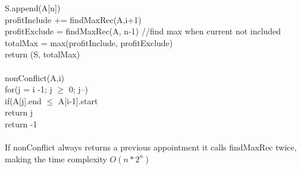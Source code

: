 \documentclass[12pt]{article}
\begin{document}
\begin{enumerate}
\begin{enumerate}
 \hspace*{15mm} S.append(A[n])\\
 \hspace*{15mm} profitInclude += findMaxRec(A,i+1)\\
 \hspace*{10mm} profitExclude = findMaxRec(A, n-1) //find max when current not included \\
 \hspace*{10mm} totalMax = max(profitInclude, profitExclude) \\
 return (S, totalMax)\\
 \\
 nonConflict(A,i)\\
 \hspace*{10mm}for(j = i -1; j $\geq$ 0; j--)\\
 \hspace*{15mm} if(A[j].end $\leq$ A[i-1].start\\
 \hspace*{20mm} return j\\
 \hspace*{10mm} return -1 \\
 \\ If nonConflict always returns a previous appointment it calls findMaxRec twice, making the time complexity $O(n*2^n)$
 
 
 


\end{enumerate}
\end{enumerate}
\end{document}
